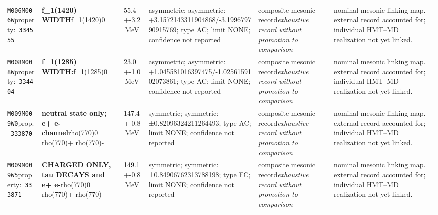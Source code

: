 \begin{landscape}
\begin{longtable}{L{1.85cm}L{4.45cm}L{2.35cm}L{4.05cm}L{3.35cm}L{7.15cm}}
\texttt{M006}\newline \texttt{M006W}\newline property:\ \texttt{334555} & \textbf{f\_\allowbreak{}1(1420) WIDTH}\newline f\_\allowbreak{}1(1420)0 & 55.4+-3.2\,MeV & asymmetric; asymmetric: +3.1572143311904868/-3.199679790915769; type AC; limit NONE; confidence not reported & composite mesonic record\newline \emph{exhaustive record without promotion to comparison} & nominal mesonic linking map. external record accounted for; individual HMT--MD realization not yet linked. \\
\texttt{M008}\newline \texttt{M008W}\newline property:\ \texttt{334404} & \textbf{f\_\allowbreak{}1(1285) WIDTH:}\newline f\_\allowbreak{}1(1285)0 & 23.0+-1.0\,MeV & asymmetric; asymmetric: +1.045581016397475/-1.0256159102073861; type AC; limit NONE; confidence not reported & composite mesonic record\newline \emph{exhaustive record without promotion to comparison} & nominal mesonic linking map. external record accounted for; individual HMT--MD realization not yet linked. \\
\texttt{M009}\newline \texttt{M009W0}\newline prop.\ \texttt{333870} & \textbf{neutral state only; e+ e- channel}\newline rho(770)0 \textbar{}\allowbreak{} rho(770)+ \textbar{}\allowbreak{} rho(770)- & 147.4+-0.8\,MeV & symmetric; symmetric: ±0.82096324211264493; type AC; limit NONE; confidence not reported & composite mesonic record\newline \emph{exhaustive record without promotion to comparison} & nominal mesonic linking map. external record accounted for; individual HMT--MD realization not yet linked. \\
\texttt{M009}\newline \texttt{M009W5}\newline property:\ \texttt{333871} & \textbf{CHARGED ONLY, tau DECAYS and e+ e-}\newline rho(770)0 \textbar{}\allowbreak{} rho(770)+ \textbar{}\allowbreak{} rho(770)- & 149.1+-0.8\,MeV & symmetric; symmetric: ±0.84906762313788198; type FC; limit NONE; confidence not reported & composite mesonic record\newline \emph{exhaustive record without promotion to comparison} & nominal mesonic linking map. external record accounted for; individual HMT--MD realization not yet linked. \\

\end{longtable}
\end{landscape}
